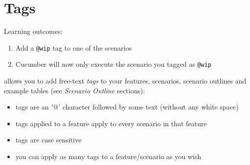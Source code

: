 \chapter*{Tags}

\ifnotes

    Learning outcomes:

    \begin{enumerate}
        \item Add a \texttt{@wip} tag to one of the scenarios
        \item Cucumber will now only execute the scenario you tagged as \texttt{@wip}
    \end{enumerate}


\fi

\ifcontent
    \CUKE{} allows you to add free-text \emph{tags} to your features, scenarios, scenario outlines and example tables (see \emph{Scenario Outline} sections):

    \begin{itemize}
        \item tags are an '@' character followed by some text (without any white space)
        \item tags applied to a feature apply to every scenario in that feature
        \item tags are case sensitive
        \item you can apply as many tags to a feature/scenario as you wish
    \end{itemize}


